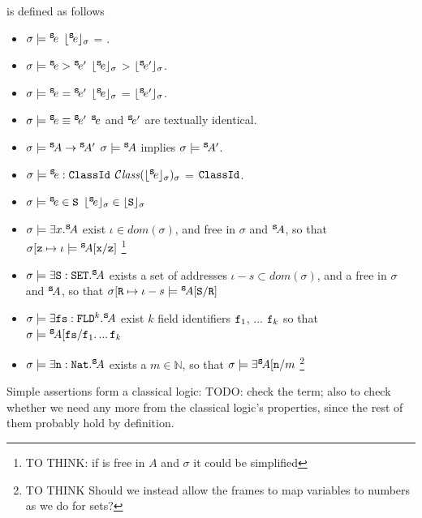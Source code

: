  \begin{definition} is defined  as follows

\begin{itemize}
\item
$\sigma \models \SE$ \IFF  $\interp{\SE}{\sigma}$ = .
\item
$\sigma \models \SE>\SEPrime$ \IFF $\interp{\SE}{\sigma}$ > $\interp{\SEPrime}{\sigma}$.
\item
$\sigma \models \SE=\SEPrime$ \IFF $\interp{\SE}{\sigma}$ = $\interp{\SEPrime}{\sigma}$.
\item
$\sigma \models \SE\equiv\SEPrime$ \IFF $\SE$ and $\SEPrime$ are textually identical.
\item
$\sigma \models \SA \rightarrow \SAPrime $ \IFF $\sigma \models \SA$ implies $\sigma \models \SAPrime$. 
\item
$\sigma \models  \SE:\prg{ClassId}$ \IFF $\ClassOf {\interp{\SE}{\sigma}} {\sigma}$ = $\prg{ClassId}$.
\item
$\sigma \models  \SE\in \prg{S}$ \IFF $\interp{\SE}{\sigma}\in \interp{\prg{S}}{\sigma}$
\item
$\sigma \models  \exists x.\SA$ \IFF  exist  $\iota\in dom(\sigma)$, and    free in $\sigma$ and $\SA$, so that
$\sigma[\prg{z}\mapsto \iota \models  \SA[\prg{x}/\prg{z}]$ \footnote{TO THINK: if  is free in $A$ and $\sigma$ it could be simplified}
\item
$\sigma \models  \exists \prg{S}:\prg{SET}.\SA$ \IFF  exists a set of addresses $\iota-s\subset dom(\sigma)$, and a  free in $\sigma$ and $\SA$, so that
$\sigma[\prg{R}\mapsto \iota-s \models  \SA[\prg{S}/\prg{R}]$ 
\item
$\sigma \models  \exists \prg{fs}:\prg{FLD}^k.\SA$ \IFF  exist $k$ field identifiers $\prg{f}_1$, ... $\prg{f}_k$ so that 
$\sigma \models  \SA[\prg{fs}/\prg{f}_1.\,...\,\prg{f}_k$ 
\item
$\sigma \models  \exists \prg{n}:\prg{Nat}.\SA$ \IFF  exists a $m\in\mathbb{N}$, so that $\sigma \models  \exists \SA[\prg{n}/m$ 
\footnote{TO THINK Should we instead allow the frames to map variables to numbers as we do for sets?}
\end{itemize}
\end{definition}

Simple assertions form a classical logic: TODO: check the term; also to check whether we need any more from the classical logic's properties, since the rest of them probably hold by definition.

